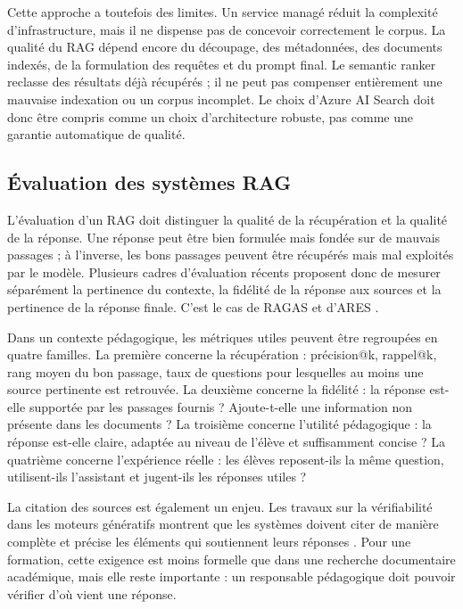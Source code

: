 Cette approche a toutefois des limites. Un service managé réduit la complexité
d'infrastructure, mais il ne dispense pas de concevoir correctement le corpus. La qualité
du RAG dépend encore du découpage, des métadonnées, des documents indexés, de la
formulation des requêtes et du prompt final. Le semantic ranker reclasse des résultats
déjà récupérés ; il ne peut pas compenser entièrement une mauvaise indexation ou un
corpus incomplet. Le choix d'Azure AI Search doit donc être compris comme un choix
d'architecture robuste, pas comme une garantie automatique de qualité.

\subsection{Évaluation des systèmes RAG}

L'évaluation d'un RAG doit distinguer la qualité de la récupération et la qualité de la
réponse. Une réponse peut être bien formulée mais fondée sur de mauvais passages ; à
l'inverse, les bons passages peuvent être récupérés mais mal exploités par le modèle.
Plusieurs cadres d'évaluation récents proposent donc de mesurer séparément la pertinence
du contexte, la fidélité de la réponse aux sources et la pertinence de la réponse finale.
C'est le cas de RAGAS \cite{es2023ragas} et d'ARES \cite{saadfalcon2023ares}.

Dans un contexte pédagogique, les métriques utiles peuvent être regroupées en quatre
familles. La première concerne la récupération : précision@k, rappel@k, rang moyen du
bon passage, taux de questions pour lesquelles au moins une source pertinente est
retrouvée. La deuxième concerne la fidélité : la réponse est-elle supportée par les passages
fournis ? Ajoute-t-elle une information non présente dans les documents ? La troisième
concerne l'utilité pédagogique : la réponse est-elle claire, adaptée au niveau de l'élève et
suffisamment concise ? La quatrième concerne l'expérience réelle : les élèves reposent-ils
la même question, utilisent-ils l'assistant et jugent-ils les réponses utiles ?

La citation des sources est également un enjeu. Les travaux sur la vérifiabilité dans les
moteurs génératifs montrent que les systèmes doivent citer de manière complète et
précise les éléments qui soutiennent leurs réponses \cite{liu2023evaluating}. Pour une
formation, cette exigence est moins formelle que dans une recherche documentaire
académique, mais elle reste importante : un responsable pédagogique doit pouvoir
vérifier d'où vient une réponse.

